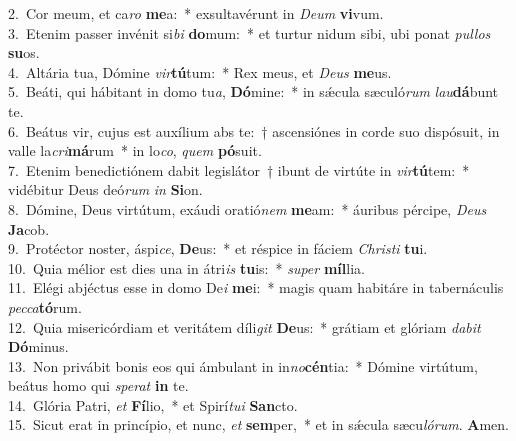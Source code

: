 {2.~}Cor meum, et ca\textit{ro} \textbf{me}a:~* exsultavérunt in \textit{De}\textit{um} \textbf{vi}vum.\\
{3.~}Etenim passer invénit si\textit{bi} \textbf{do}mum:~* et turtur nidum sibi, ubi ponat \textit{pul}\textit{los} \textbf{su}os.\\
{4.~}Altária tua, Dómine \textit{vir}\textbf{tú}tum:~* Rex meus, et \textit{De}\textit{us} \textbf{me}us.\\
{5.~}Beáti, qui hábitant in domo tu\textit{a}, \textbf{Dó}mine:~* in sǽcula sæculó\textit{rum} \textit{lau}\textbf{dá}bunt te.\\
{6.~}Beátus vir, cujus est auxílium abs te:~† ascensiónes in corde suo dispósuit, in valle la\textit{cri}\textbf{má}rum~* in lo\textit{co}, \textit{quem} \textbf{pó}suit.\\
{7.~}Etenim benedictiónem dabit legislátor~† ibunt de virtúte in \textit{vir}\textbf{tú}tem:~* vidébitur Deus deó\textit{rum} \textit{in} \textbf{Si}on.\\
{8.~}Dómine, Deus virtútum, exáudi oratió\textit{nem} \textbf{me}am:~* áuribus pércipe, \textit{De}\textit{us} \textbf{Ja}cob.\\
{9.~}Protéctor noster, áspi\textit{ce}, \textbf{De}us:~* et réspice in fáciem \textit{Chri}\textit{sti} \textbf{tu}i.\\
{10.~}Quia mélior est dies una in átri\textit{is} \textbf{tu}is:~* \textit{su}\textit{per} \textbf{míl}lia.\\
{11.~}Elégi abjéctus esse in domo De\textit{i} \textbf{me}i:~* magis quam habitáre in tabernáculis \textit{pec}\textit{ca}\textbf{tó}rum.\\
{12.~}Quia misericórdiam et veritátem díli\textit{git} \textbf{De}us:~* grátiam et glóriam \textit{da}\textit{bit} \textbf{Dó}minus.\\
{13.~}Non privábit bonis eos qui ámbulant in in\textit{no}\textbf{cén}tia:~* Dómine virtútum, beátus homo qui \textit{spe}\textit{rat} \textbf{in} te.\\
{14.~}Glória Patri, \textit{et} \textbf{Fí}lio,~* et Spirí\textit{tu}\textit{i} \textbf{San}cto.\\
{15.~}Sicut erat in princípio, et nunc, \textit{et} \textbf{sem}per,~* et in sǽcula sæcu\textit{ló}\textit{rum}. \textbf{A}men.\\
